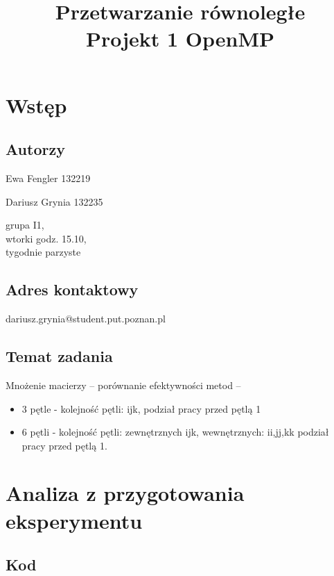 \documentclass[12pt,a4paper]{article}
\date{}
\title{Przetwarzanie równoległe \\ \Large Projekt 1 OpenMP}
\begin{document}
\maketitle
\thispagestyle{empty}

\vspace{1cm}
\section{Wstęp}

\subsection{Autorzy}
Ewa Fengler 132219

Dariusz Grynia 132235

grupa I1,\\
wtorki godz. 15.10,\\
tygodnie parzyste\\

\subsection{Adres kontaktowy}
dariusz.grynia@student.put.poznan.pl\\

\subsection{Temat zadania}
Mnożenie macierzy -- porównanie efektywności metod --
\begin{itemize}

\item 3 pętle - kolejność pętli: ijk, podział pracy przed pętlą 1
\item 6 pętli - kolejność pętli: zewnętrznych ijk, wewnętrznych: ii,jj,kk podział pracy przed pętlą 1.
\end{itemize}


\section{Analiza z przygotowania eksperymentu}


\subsection{Kod}
\end{document}
